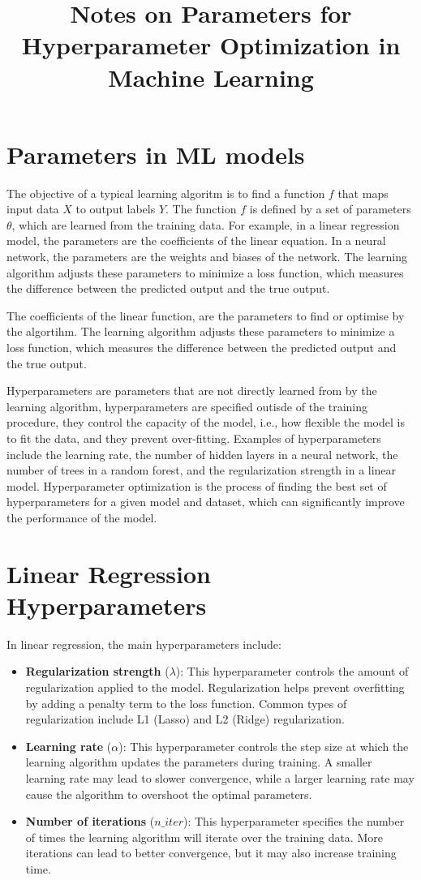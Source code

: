\documentclass[conference]{IEEEtran}
\title{Notes on Parameters for Hyperparameter Optimization in Machine Learning}
\author{
\IEEEauthorblockN{Luis Mendez}
}
\begin{document}
\maketitle

\section*{Parameters in ML models}
The objective of a typical learning algoritm is to find a function $f$ that maps input data $X$ to output labels $Y$. The function $f$ is defined by a set of parameters $\theta$, which are learned from the training data. For example, in a linear regression model, the parameters are the coefficients of the linear equation. In a neural network, the parameters are the weights and biases of the network. The learning algorithm adjusts these parameters to minimize a loss function, which measures the difference between the predicted output and the true output.

The coefficients of the linear function, are the parameters to find or optimise by the algortihm. The learning algorithm adjusts these parameters to minimize a loss function, which measures the difference between the predicted output and the true output.

Hyperparameters are parameters that are not directly learned from by the learning algorithm, hyperparameters are specified outisde of the training procedure, they control the capacity of the model, i.e., how flexible the model is to fit the data, and they prevent over-fitting. Examples of hyperparameters include the learning rate, the number of hidden layers in a neural network, the number of trees in a random forest, and the regularization strength in a linear model. Hyperparameter optimization is the process of finding the best set of hyperparameters for a given model and dataset, which can significantly improve the performance of the model.

\section*{Linear Regression Hyperparameters}
In linear regression, the main hyperparameters include:
\begin{itemize}
    \item \textbf{Regularization strength} ($\lambda$): This hyperparameter controls the amount of regularization applied to the model. Regularization helps prevent overfitting by adding a penalty term to the loss function. Common types of regularization include L1 (Lasso) and L2 (Ridge) regularization.
    \item \textbf{Learning rate} ($\alpha$): This hyperparameter controls the step size at which the learning algorithm updates the parameters during training. A smaller learning rate may lead to slower convergence, while a larger learning rate may cause the algorithm to overshoot the optimal parameters.
    \item \textbf{Number of iterations} ($n\_iter$): This hyperparameter specifies the number of times the learning algorithm will iterate over the training data. More iterations can lead to better convergence, but it may also increase training time.
\end{itemize}
\end{document}
